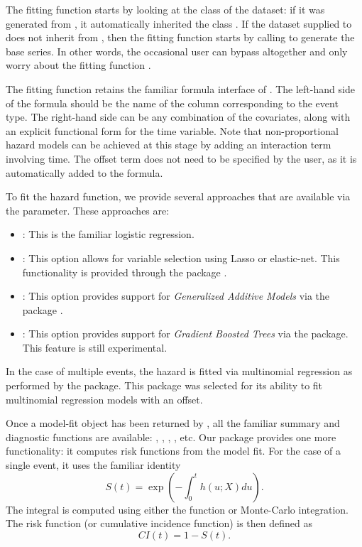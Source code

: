 \documentclass[
]{jss}
\providecommand{\tightlist}{%
  \setlength{\itemsep}{0pt}\setlength{\parskip}{0pt}}
\begin{document}
The fitting function  starts by looking at the
class of the dataset: if it was generated from , it
automatically inherited the class . If the dataset supplied
to  does not inherit from , then the
fitting function starts by calling  to generate the
base series. In other words, the occasional user can bypass
 altogether and only worry about the fitting
function .

The fitting function retains the familiar formula interface of
. The left-hand side of the formula should be the name of the
column corresponding to the event type. The right-hand side can be any
combination of the covariates, along with an explicit functional form
for the time variable. Note that non-proportional hazard models can be
achieved at this stage by adding an interaction term involving time. The
offset term does not need to be specified by the user, as it is
automatically added to the formula.

To fit the hazard function, we provide several approaches that are
available via the  parameter. These approaches are:

\begin{itemize}
\tightlist
\item
  : This is the familiar logistic regression.
\item
  : This option allows for variable selection using Lasso
  or elastic-net. This functionality is provided through the
   package \citep{friedman2010jss}.
\item
  : This option provides support for \emph{Generalized
  Additive Models} via the  package
  \citep{hastie1987generalized}.
\item
  : This option provides support for \emph{Gradient Boosted
  Trees} via the  package. This feature is still experimental.
\end{itemize}

In the case of multiple events, the hazard is fitted via multinomial
regression as performed by the  package. This package was
selected for its ability to fit multinomial regression models with an
offset.

Once a model-fit object has been returned by , all
the familiar summary and diagnostic functions are available:
, , , , etc. Our
package provides one more functionality: it computes risk functions from
the model fit. For the case of a single event, it uses the familiar
identity \begin{equation}\label{eqn:surv}
S(t) = \exp\left(-\int_0^t h(u;X) du\right).
\end{equation} The integral is computed using either the
 function or Monte-Carlo integration. The risk
function (or cumulative incidence function) is then defined as
\begin{equation}\label{eqn:CI}
CI(t) = 1 - S(t).
\end{equation}
\end{document}
